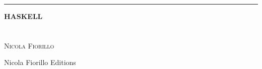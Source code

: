 \begin{titlepage}
	
	\raggedleft
	\rule{1pt}{\textheight}
	\hspace{0.05\textwidth}
	\parbox[b]{0.85\textwidth}{
		
		{\Huge\bfseries HASKELL\\\\}\\[2\baselineskip]
		{\Large\textsc{Nicola Fiorillo}}
        {\date{\today}}
		
		\vspace{0.5\textheight}
		
		{\noindent Nicola Fiorillo Editions}\\[\baselineskip]
	}

\end{titlepage}
